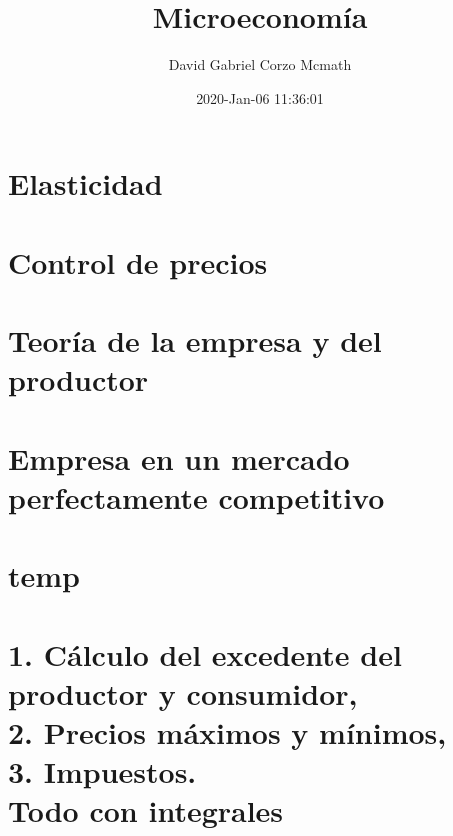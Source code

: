 \documentclass[openany]{book}
\title{Microeconomía}
\author{David Gabriel Corzo Mcmath}
\date{2020-Jan-06 11:36:01}
\begin{document}
\maketitle
\tableofcontents

\chapter{Elasticidad}



\chapter{Control de precios}




\chapter{Teoría de la empresa y del productor}



\chapter{Empresa en un mercado perfectamente competitivo}



\chapter{temp}


\chapter{1. Cálculo del excedente del productor y consumidor, \\2. Precios máximos y mínimos, \\ 3. Impuestos. \\ Todo con integrales}

\end{document}
